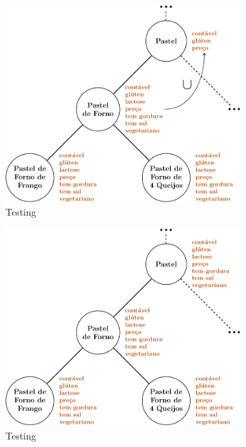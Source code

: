 \documentclass[10pt,a4paper]{article}
\begin{document}
\begin{figure}
\begin{subfigure}{0.49\linewidth}
			\includegraphics[width=0.9\linewidth]{../bottomup-3.pdf}
			\caption{Testing}
		\end{subfigure}
		\begin{subfigure}{0.49\linewidth}
			\includegraphics[width=0.9\linewidth]{../bottomup-4.pdf}
			\caption{Testing}
		\end{subfigure}
		\\
		\begin{subfigure}{0.49\linewidth}

\end{subfigure}
\end{figure}
\end{document}
